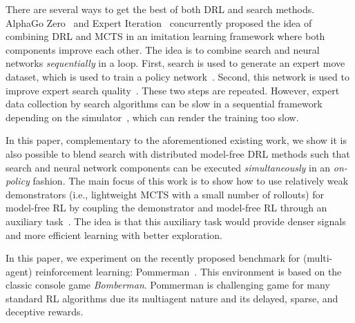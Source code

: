 \documentclass[letterpaper]{article}
\begin{document}
There are several ways to get the best of both DRL and search methods. AlphaGo Zero~\cite{silver2017mastering} and Expert Iteration~\cite{anthony2017thinking} concurrently proposed the idea of combining DRL and MCTS in an imitation learning framework where both components improve each other. The idea is to combine search and neural networks \emph{sequentially} in a loop. First, search is used to generate an expert move dataset, which is used to train a policy network~\cite{guo2014deep}. Second, this network is used to improve expert search quality~\cite{anthony2017thinking}. These two steps are repeated. However, expert data collection by search algorithms can be slow in a sequential framework depending on the simulator~\cite{guo2014deep}, which can render the training too slow.

In this paper, complementary to the aforementioned existing work, we show it is also possible to blend search with distributed model-free DRL methods such that search and neural network components can be executed \emph{simultaneously} in an \textit{on-policy} fashion. The main focus of this work is to show how to use relatively weak demonstrators (i.e., lightweight MCTS with a small number of rollouts) for model-free RL by coupling the demonstrator and model-free RL through an auxiliary task~\cite{jaderberg2016reinforcement}. The idea is that this auxiliary task would provide denser signals and more efficient learning with better exploration.

In this paper, we experiment on the recently proposed benchmark for (multi-agent) reinforcement learning: Pommerman~\cite{resnick2018pommerman}. This environment is based on the classic console game \emph{Bomberman}. Pommerman is  challenging game for many standard RL algorithms due its multiagent nature and its delayed, sparse, and deceptive rewards.
\end{document}
